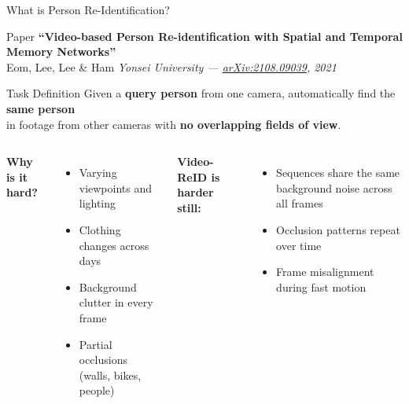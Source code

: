 \documentclass[aspectratio=169]{beamer}
\newcommand{\bt}[1]{\textbf{#1}}
\begin{document}
\begin{frame}{What is Person Re-Identification?}
  \begin{block}{Paper}
    \bt{``Video-based Person Re-identification with Spatial and Temporal Memory Networks''}\\
    Eom, Lee, Lee \& Ham \hfill \textit{Yonsei University --- \href{https://arxiv.org/abs/2108.09039}{arXiv:2108.09039}, 2021}
  \end{block}
  \vspace{0.2em}
  \begin{alertblock}{Task Definition}
    Given a \bt{query person} from one camera, automatically find the \bt{same person}\\
    in footage from other cameras with \bt{no overlapping fields of view}.
  \end{alertblock}
  \vspace{0.2em}
  \begin{columns}[T]
      \bt{Why is it hard?}
      \begin{itemize}\setlength\itemsep{2pt}
        \item Varying viewpoints and lighting
        \item Clothing changes across days
        \item Background clutter in every frame
        \item Partial occlusions (walls, bikes, people)
      \end{itemize}
      \bt{Video-ReID is harder still:}
      \begin{itemize}\setlength\itemsep{2pt}
        \item Sequences share the same background noise across all frames
        \item Occlusion patterns repeat over time
        \item Frame misalignment during fast motion
      \end{itemize}
  \end{columns}
\end{frame}
\end{document}
